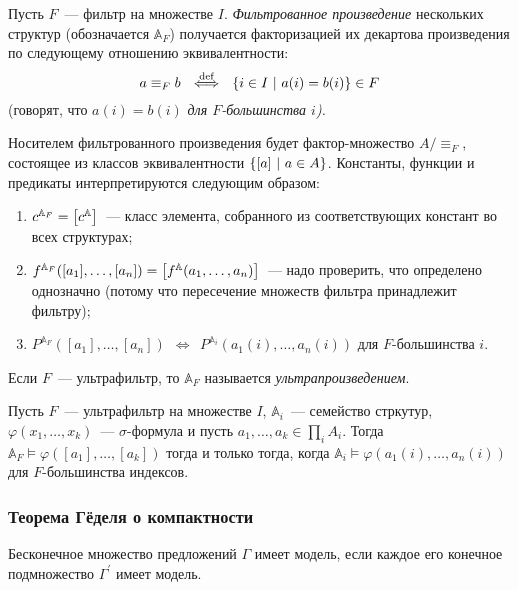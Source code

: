 \begin{definition}
    Пусть $F$~— фильтр на множестве $I$. \emph{Фильтрованное произведение} нескольких структур (обозначается $\mathbb{A}_F$) получается факторизацией их декартова произведения по следующему отношению эквивалентности:
	\[a \equiv_F b\ \ \overset{\text{def}}{\Longleftrightarrow}\ \ 
	  \set*{i \in I\ \middle\vert\ a(i) = b(i)} \in F\]    
    (говорят, что $a(i) = b(i)$ \emph{для $F$-большинства $i$).}

    Носителем фильтрованного произведения будет фактор-множество \(A / {\equiv_F}\), состоящее из классов эквивалентности \(\set*{ \segment*{a}\ \middle\vert\ a \in A}\). Константы, функции и предикаты интерпретируются следующим образом:
    \begin{enumerate}
	\item $c^{\mathbb{A}_F} = \segment*{c^{\mathbb{A}}}$~— класс элемента, собранного из соответствующих констант во всех структурах;
	\item $f^{\mathbb{A}_F}\lr*{[a_1], \ldots, [a_n]} =
	      \segment*{f^{\mathbb{A}}\lr*{a_1, \ldots, a_n}}$~— надо проверить, что определено однозначно (потому что пересечение множеств фильтра принадлежит фильтру); 
	\item $P^{\mathbb{A}_F}([a_1], \ldots, [a_n])\ \ \Longleftrightarrow\ \ 
	       P^{\mathbb{A}_i} (a_1(i), \ldots, a_n(i))$ для $F$-большинства $i$. 
    \end{enumerate}
\end{definition} 

    Если $F$~— ультрафильтр, то $\mathbb{A}_{F}$ называется \textit{ультрапроизведением}.


\begin{theorem}[об ультрапроизведениях]
    Пусть $F$~— ультрафильтр на множестве $I$, $\mathbb{A}_i$~— семейство стркутур, $\varphi(x_1, \ldots, x_k)$~— $\sigma$-формула и пусть $a_1, \ldots, a_k \in \prod_i A_i$. Тогда $\mathbb{A}_F \models \varphi([a_1], \ldots, [a_k])$ тогда и только тогда, когда $\mathbb{A}_i \models \varphi(a_1(i), \ldots, a_n(i))$ для $F$-большинства индексов.
\end{theorem} 

\subsubsection{Теорема Гёделя о компактности} 

\begin{theorem}
    Бесконечное множество предложений $\Gamma$ имеет модель, если каждое его конечное подмножество $\Gamma^\prime$ имеет модель.
\end{theorem}


